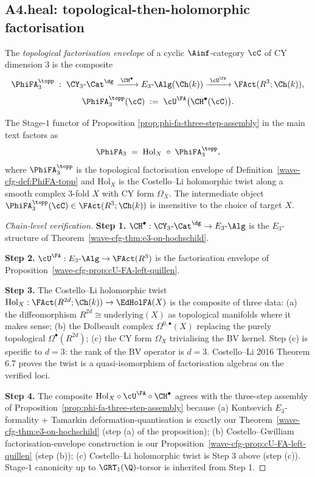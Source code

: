 \subsection*{A4.heal: topological-then-holomorphic factorisation}

\begin{definition}
\label{wave-cfg-def:PhiFA-topp}
The \emph{topological factorisation envelope} of a cyclic
$\Ainf$-category $\cC$ of CY dimension $3$ is the composite
\[
\PhiFA_3^\topp\;:\;\CY_3\text{-}\Cat^{\dg}
\xrightarrow{\;\CH^\bullet\;}E_3\text{-}\Alg(\Ch(k))
\xrightarrow{\;\cU^\FA\;}\FAct(R^3;\Ch(k)),
\]
\[
\PhiFA_3^\topp(\cC)\;:=\;\cU^\FA\bigl(\CH^\bullet(\cC)\bigr).
\]
\end{definition}

\begin{proposition}
\label{wave-cfg-prop:stage-one-top-then-hol}
The Stage-$1$ functor of Proposition
\ref{prop:phi-fa-three-step-assembly} in the main text factors as
\[
\PhiFA_3\;=\;\mathrm{Hol}_X\;\circ\;\PhiFA_3^\topp,
\]
where $\PhiFA_3^\topp$ is the topological factorisation envelope of
Definition~\ref{wave-cfg-def:PhiFA-topp} and $\mathrm{Hol}_X$ is the
Costello--Li holomorphic twist along a smooth complex $3$-fold $X$
with CY form $\Omega_X$. The intermediate object
$\PhiFA_3^\topp(\cC)\in\FAct(R^3;\Ch(k))$ is insensitive to the choice
of target $X$.
\end{proposition}

\begin{proof}[Chain-level verification]
\textbf{Step 1.} $\CH^\bullet:\CY_3\text{-}\Cat^{\dg}\to E_3\text{-}\Alg$
is the $E_3$-structure of Theorem~\ref{wave-cfg-thm:e3-on-hochschild}.

\textbf{Step 2.} $\cU^\FA:E_3\text{-}\Alg\to\FAct(R^3)$ is the
factorisation envelope of
Proposition~\ref{wave-cfg-prop:cU-FA-left-quillen}.

\textbf{Step 3.} The Costello--Li holomorphic twist
$\mathrm{Hol}_X:\FAct(R^{2d};\Ch(k))\to\EdHolFA(X)$ is the composite of
three data: (a) the diffeomorphism $R^{2d}\cong\mathrm{underlying}
(X)$ as topological manifolds where it makes sense; (b) the Dolbeault
complex $\Omega^{0,\bullet}(X)$ replacing the purely topological
$\Omega^\bullet(R^{2d})$; (c) the CY form $\Omega_X$ trivialising the
BV kernel. Step (c) is specific to $d=3$: the rank of the BV operator
is $d=3$. Costello--Li 2016 Theorem 6.7 proves the twist is a
quasi-isomorphism of factorisation algebras on the verified loci.

\textbf{Step 4.} The composite $\mathrm{Hol}_X\circ\cU^\FA\circ
\CH^\bullet$ agrees with the three-step assembly of
Proposition~\ref{prop:phi-fa-three-step-assembly} because (a)
Kontsevich $E_3$-formality + Tamarkin deformation-quantisation is
exactly our Theorem~\ref{wave-cfg-thm:e3-on-hochschild} (step (a) of
the proposition); (b) Costello--Gwilliam factorisation-envelope
construction is our Proposition~\ref{wave-cfg-prop:cU-FA-left-quillen}
(step (b)); (c) Costello--Li holomorphic twist is Step 3 above (step
(c)). Stage-$1$ canonicity up to $\GRT_1(\Q)$-torsor is inherited from
Step 1.
\end{proof}

